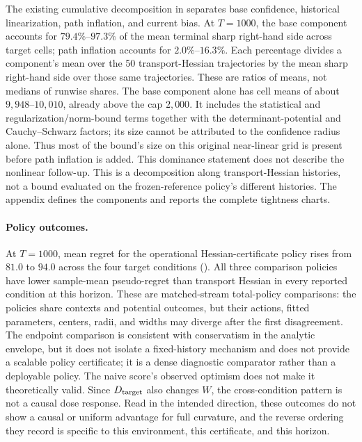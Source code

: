 The existing cumulative decomposition in
 separates base confidence,
historical linearization, path inflation, and current bias.  At $T=1000$,
the base component accounts for $79.4\%$--$97.3\%$ of the mean terminal
sharp right-hand side across target cells; path inflation accounts for
$2.0\%$--$16.3\%$.  Each percentage divides a component's mean over the
50 transport-Hessian trajectories by the mean sharp right-hand side over
those same trajectories.  These are ratios of means, not medians of runwise
shares.  The base component alone has cell means of about
$9{,}948$--$10{,}010$, already above the cap $2{,}000$.  It includes the
statistical and regularization/norm-bound terms together with the
determinant-potential and Cauchy--Schwarz factors; its size cannot be
attributed to the confidence radius alone.  Thus most of the bound's size
on this original near-linear grid is present before path inflation is added.
This dominance statement does not describe the nonlinear follow-up.  This is a
decomposition along transport-Hessian histories, not a bound evaluated on
the frozen-reference policy's different histories.  The appendix defines
the components and reports the complete tightness charts.

\paragraph{Policy outcomes.}
At $T=1000$, mean regret for the operational Hessian-certificate policy rises
from $81.0$ to $94.0$ across the four target conditions
().  All three comparison
policies have lower sample-mean pseudo-regret than transport Hessian in every
reported condition at this horizon.  These are matched-stream
total-policy comparisons: the policies share contexts and potential outcomes,
but their actions, fitted parameters, centers, radii, and widths may diverge
after the first disagreement.  The endpoint comparison is consistent with
conservatism in the analytic envelope, but it does not isolate a fixed-history
mechanism and does not provide a scalable policy certificate; it is a dense
diagnostic comparator rather than a deployable policy.  The naive score's
observed optimism does not make it theoretically valid.  Since $D_{\rm target}$
also changes $W$, the cross-condition pattern is not a causal dose response.
Read in the intended direction, these outcomes do not show a causal or uniform
advantage for full curvature, and the reverse ordering they record is specific
to this environment, this certificate, and this horizon.

